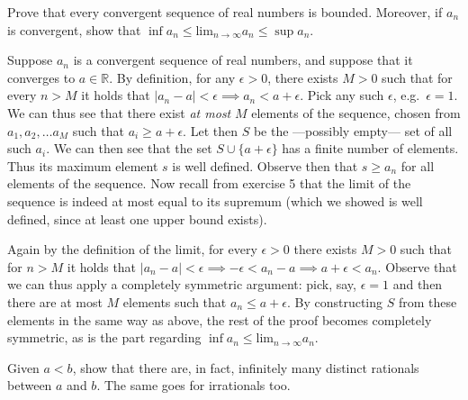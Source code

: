 \begin{exercise}{6}
    Prove that every convergent sequence of real numbers is bounded. Moreover, if $a_n$ is convergent, show that $\inf a_n \leq \text{lim}_{n \rightarrow \infty} a_n \leq \sup a_n$.
\end{exercise}

\begin{solution}

    Suppose $a_n$ is a convergent sequence of real numbers, and suppose that it converges to $a \in \mathbb{R}$. By definition, for any $\epsilon > 0$, there exists $M > 0$ such that for every $n > M$ it holds that $\lvert a_n - a \rvert < \epsilon \implies a_n < a + \epsilon$. Pick any such $\epsilon$, e.g.\ $\epsilon = 1$. We can thus see that there exist \textit{at most} $M$ elements of the sequence, chosen from $a_1, a_2, \ldots a_M$ such that $a_i \geq a + \epsilon$. Let then $S$ be the ---possibly empty--- set of all such $a_i$. We can then see that the set $S \cup \{a + \epsilon\}$ has a finite number of elements. Thus its maximum element $s$ is well defined.  Observe then that $s \geq a_n$ for all elements of the sequence. Now recall from exercise 5 that the limit of the sequence is indeed at most equal to its supremum (which we showed is well defined, since at least one upper bound exists).

    Again by the definition of the limit, for every $\epsilon > 0$ there exists $M > 0$ such that for $n > M$ it holds that $\lvert a_n - a \rvert < \epsilon \implies -\epsilon < a_n -a \implies a+ \epsilon < a_n$. Observe that we can thus apply a completely symmetric argument: pick, say, $\epsilon=1$ and then there are at most $M$ elements such that $a_n \leq a + \epsilon$. By constructing $S$ from these elements in the same way as above, the rest of the proof becomes completely symmetric, as is the part regarding $\inf a_n \leq \text{lim}_{n \rightarrow \infty} a_n$.
\end{solution}

\begin{exercise}{8}
    Given $a < b$, show that there are, in fact, infinitely many distinct rationals between $a$ and $b$. The same goes for irrationals too.
\end{exercise}

